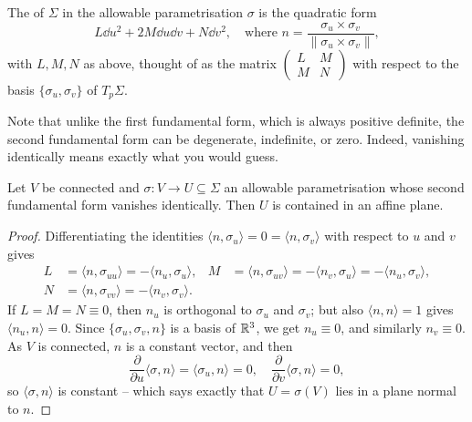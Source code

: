 \documentclass[a4paper]{scrartcl}
\begin{document}
\begin{definition}
    The  of $\Sigma$ in the allowable parametrisation $\sigma$ is the quadratic form
    $$
    L \dd u^2 + 2M \dd u \dd v + N \dd v^2, \quad \text{where } n = \frac{\sigma_u \times \sigma_v}{\|\sigma_u \times \sigma_v\|},
    $$
    with $L, M, N$ as above, thought of as the matrix $\begin{pmatrix} L & M \\ M & N \end{pmatrix}$ with respect to the basis $\{\sigma_u, \sigma_v\}$ of $T_p \Sigma$.
\end{definition}

Note that unlike the first fundamental form, which is always positive definite, the second fundamental form can be degenerate, indefinite, or zero. Indeed, vanishing identically means exactly what you would guess.

\begin{lemma}
    Let $V$ be connected and $\sigma : V \rightarrow U \subseteq \Sigma$ an allowable parametrisation whose second fundamental form vanishes identically. Then $U$ is contained in an affine plane.
\end{lemma}
\begin{proof}
    Differentiating the identities $\langle n, \sigma_u \rangle = 0 = \langle n, \sigma_v \rangle$ with respect to $u$ and $v$ gives
    \begin{align*}
        L &= \langle n, \sigma_{uu} \rangle = -\langle n_u, \sigma_u \rangle, &
        M &= \langle n, \sigma_{uv} \rangle = -\langle n_v, \sigma_u\rangle = -\langle n_u, \sigma_v \rangle, \\
        N &= \langle n, \sigma_{vv} \rangle = -\langle n_v, \sigma_v \rangle. & &
    \end{align*}
    If $L = M = N \equiv 0$, then $n_u$ is orthogonal to $\sigma_u$ and $\sigma_v$; but also $\langle n, n \rangle = 1$ gives $\langle n_u, n \rangle = 0$. Since $\{\sigma_u, \sigma_v, n\}$ is a basis of $\mathbb{R}^3$, we get $n_u \equiv 0$, and similarly $n_v \equiv 0$. As $V$ is connected, $n$ is a constant vector, and then
    $$
    \frac{\partial}{\partial u}\langle \sigma, n \rangle = \langle \sigma_u, n \rangle = 0, \quad \frac{\partial}{\partial v}\langle \sigma, n \rangle = 0,
    $$
    so $\langle \sigma, n \rangle$ is constant -- which says exactly that $U = \sigma(V)$ lies in a plane normal to $n$.
\end{proof}
\end{document}

